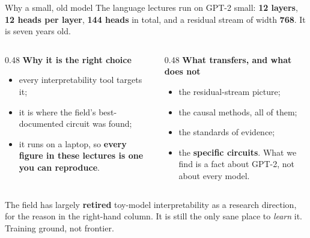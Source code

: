 \documentclass[aspectratio=169]{beamer}
\newcommand{\watchbox}[1]{%
  \begin{tcolorbox}[colback=armorange!12, colframe=armorange, boxrule=0.6pt, arc=2pt]
  #1
  \end{tcolorbox}}
\begin{document}
\begin{frame}{Why a small, old model}
  \vspace{0.4em}
  The language lectures run on GPT-2 small: \textbf{12 layers}, \textbf{12 heads per layer},
  \textbf{144 heads} in total, and a residual stream of width \textbf{768}. It is seven years old.

  \vspace{0.8em}
  \begin{columns}[T]
    \begin{column}{0.48\textwidth}
      \textbf{Why it is the right choice}
      \begin{itemize}\small
        \item every interpretability tool targets it;
        \item it is where the field's best-documented circuit was found;
        \item it runs on a laptop, so \textbf{every figure in these lectures is one you can
              reproduce}.
      \end{itemize}
    \end{column}
    \begin{column}{0.48\textwidth}
      \textbf{What transfers, and what does not}
      \begin{itemize}\small
        \item[\textcolor{paramgreen}{\ding{51}}] the residual-stream picture;
        \item[\textcolor{paramgreen}{\ding{51}}] the causal methods, all of them;
        \item[\textcolor{paramgreen}{\ding{51}}] the standards of evidence;
        \item[\textcolor{armred}{\ding{55}}] the \textbf{specific circuits}. What we find is a
              fact about GPT-2, not about every model.
      \end{itemize}
    \end{column}
  \end{columns}

  \vspace{0.4em}
  \watchbox{\small The field has largely \textbf{retired} toy-model interpretability as a research
  direction, for the reason in the right-hand column. It is still the only sane place to
  \emph{learn} it. Training ground, not frontier.}
\end{frame}
\end{document}
